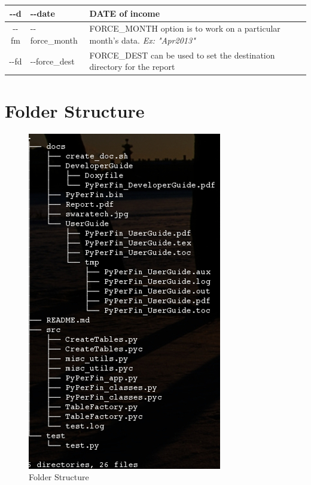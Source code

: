 \documentclass[a4paper,11pt]{book}
\begin{document}
\begin{table}[ht]
\begin{tabular}{c|l|| p{8cm}}
    \--\--d & \--\--date &  DATE of income\\ 
    \hline
    \hline
    
    \--\--fm & \--\--force\_month & FORCE\_MONTH option is to work on a particular month's data. \emph{Ex: "Apr2013"} \\ 
    \hline
    \hline
    
    \--\--fd & \--\--force\_dest & FORCE\_DEST can be used to set the destination directory for the report \\ 
    \hline
    \hline

\end{tabular}
\label{tab:multirow}
\end{table}

\section{Folder Structure}

\begin{figure}
\centering
\includegraphics[scale=0.9]{FolderStructure.jpg}
\caption{Folder Structure}
\end{figure}
\end{document}
